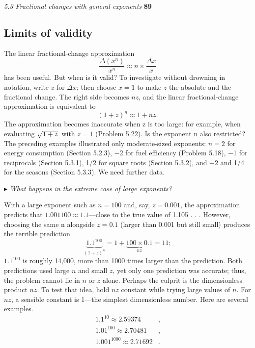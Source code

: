 \documentclass{book}
\newcounter{problem1}
\begin{document}
  \large\textit{5.3 Fractional changes with general exponents} \hfill \textbf{89} \\

\subsection {\Large Limits of validity}

\noindent \Large {The linear fractional-change approximation}
\begin{equation}
\frac{\Delta (x^n)}{x^n}\approx{n}\times{\frac{\Delta x}{x}}
\end{equation}
has been useful. But when is it valid? To investigate without drowning
in notation, write $z$ for $\Delta x$; then choose $x = 1$ to make $z$ the absolute
and the fractional change. The right side becomes $nz$, and the linear
fractional-change approximation is equivalent to
\begin{equation}
(1+z)^n\approx{1+nz}.
\end{equation}
\Large The approximation becomes inaccurate when z is too large: for example,
when evaluating $\sqrt{1+z}$ with $z = 1$ (Problem 5.22). Is the exponent n
also restricted? The preceding examples illustrated only moderate-sized
exponents: $n = 2$ for energy consumption (Section 5.2.3), −2 for fuel
efficiency (Problem 5.18), −1 for reciprocals (Section 5.3.1), 1/2 for square
roots (Section 5.3.2), and −2 and 1/4 for the seasons (Section 5.3.3). We
need further data.\par\medskip
 $\blacktriangleright$ \textit{What happens in the extreme case of large exponents?}\par\medskip
\Large With a large exponent such as $n = 100$ and, say, $z = 0.001$, the approximation
predicts that $1.001100\approx 1.1$---close to the true value of 1.105 . . .
However, choosing the same n alongside $z = 0.1$ (larger than 0.001 but
still small) produces the terrible prediction\\[12pt]
\begin{equation}
\underbrace{1.1^{100}}_{(1+z)^n} = 1+\underbrace{100\times0.1}_{nz} = 11;
\end{equation}
\Large $1.1^{100}$ is roughly 14,000, more than 1000 times larger than the prediction.
Both predictions used large $n$ and small $z$, yet only one prediction was
accurate; thus, the problem cannot lie in $n$ or $z$ alone. Perhaps the culprit
is the dimensionless product $nz$. To test that idea, hold $nz$ constant while
trying large values of $n$. For $nz$, a sensible constant is 1---the simplest
dimensionless number. Here are several examples.
\begin{equation}
\begin{split}
1.1^{10}\approx 2.59374 &,\\
1.01^{100}\approx 2.70481 &,\\
1.001^{1000}\approx 2.71692 &.
\end{split}
\end{equation}
\end{document}
